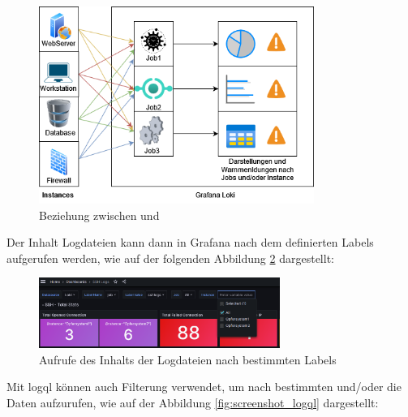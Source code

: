\begin{figure}[H]
   \centering
   \includegraphics[width=0.8\textwidth]{assets/Instance_Jobs.drawio.png}
   \caption[Beziehung zwischen  und ]
   {Beziehung zwischen  und }
   \label{fig:Labels_GrafanaLoki}
   \centering
\end{figure}

\newpage
Der Inhalt Logdateien kann dann in Grafana nach dem definierten Labels aufgerufen werden, wie auf der folgenden Abbildung \ref{fig:screenshot_labels} dargestellt:

\begin{figure}[H]
   \centering
   \includegraphics[width=0.7\textwidth]{assets/Grafana_labels.png}
   \caption[Aufrufe des Inhalts der Logdateien nach bestimmten Labels]
   {Aufrufe des Inhalts der Logdateien nach bestimmten Labels}
   \label{fig:screenshot_labels}
   \centering
\end{figure}

Mit \gls{logql} können auch Filterung verwendet, um nach bestimmten  und/oder  die Daten aufzurufen, wie auf der Abbildung \ref{fig:screenshot_logql} dargestellt:

